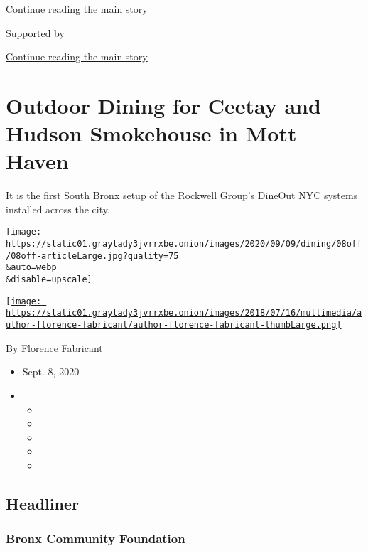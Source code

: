\protect\hyperlink{after-top}{Continue reading the main story}

Supported by

\protect\hyperlink{after-sponsor}{Continue reading the main story}

\hypertarget{outdoor-dining-for-ceetay-and-hudson-smokehouse-in-mott-haven}{%
\section{Outdoor Dining for Ceetay and Hudson Smokehouse in Mott
Haven}\label{outdoor-dining-for-ceetay-and-hudson-smokehouse-in-mott-haven}}

It is the first South Bronx setup of the Rockwell Group's DineOut NYC
systems installed across the city.

\texttt{[image: https://static01.graylady3jvrrxbe.onion/images/2020/09/09/dining/08off/08off-articleLarge.jpg?quality=75\\\&auto=webp\\\&disable=upscale]}

\href{https://www.nytimes3xbfgragh.onion/by/florence-fabricant}{\texttt{[image: https://static01.graylady3jvrrxbe.onion/images/2018/07/16/multimedia/author-florence-fabricant/author-florence-fabricant-thumbLarge.png]}}

By
\href{https://www.nytimes3xbfgragh.onion/by/florence-fabricant}{Florence
Fabricant}

\begin{itemize}
\item
  Sept. 8, 2020
\item
  \begin{itemize}
  \item
  \item
  \item
  \item
  \item
  \end{itemize}
\end{itemize}

\hypertarget{headliner}{%
\subsection{Headliner}\label{headliner}}

\hypertarget{bronx-community-foundation}{%
\subsubsection{Bronx Community
Foundation}\label{bronx-community-foundation}}

